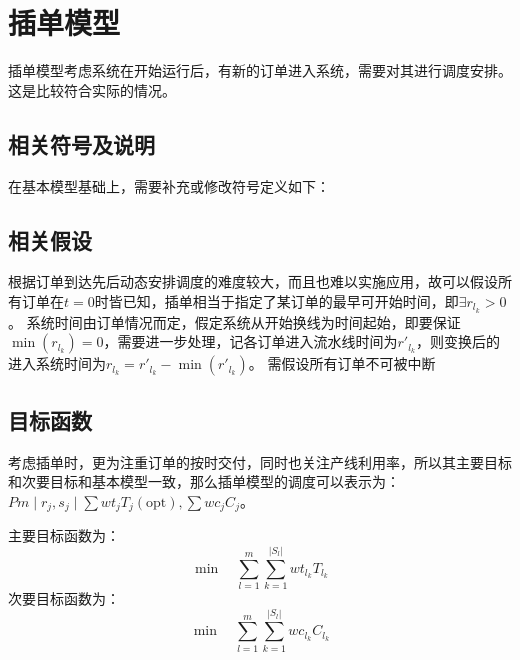 \section{插单模型}
插单模型考虑系统在开始运行后，有新的订单进入系统，需要对其进行调度安排。这是比较符合实际的情况。

\subsection{相关符号及说明}
在基本模型基础上，需要补充或修改符号定义如下：


\subsection{相关假设}
根据订单到达先后动态安排调度的难度较大，而且也难以实施应用，故可以假设所有订单在$t=0$时皆已知，插单相当于指定了某订单的最早可开始时间，即$\exists r_{l_k} >0$。
系统时间由订单情况而定，假定系统从开始换线为时间起始，即要保证$\min(r_{l_k}) = 0$，需要进一步处理，记各订单进入流水线时间为$r'_{l_k}$，则变换后的进入系统时间为$r_{l_k} = r'_{l_k} - \min(r'_{l_k})$。
需假设所有订单不可被中断

\subsection{目标函数}
考虑插单时，更为注重订单的按时交付，同时也关注产线利用率，所以其主要目标和次要目标和基本模型一致，那么插单模型的调度可以表示为：
$Pm\mid r_j, s_j\mid\sum wt_jT_j(\text{opt}), \sum wc_jC_j $。

主要目标函数为：
\begin{equation}
\min\quad \sum_{l=1}^m\sum_{k=1}^{|S_l|} wt_{l_k}T_{l_k}
\label{equ:insertobjmain}
\end{equation}
次要目标函数为：
\begin{equation}
\min\quad \sum_{l=1}^m\sum_{k=1}^{|S_l|}wc_{l_k}C_{l_k}\label{equ:insertobjsecond}
\end{equation}
